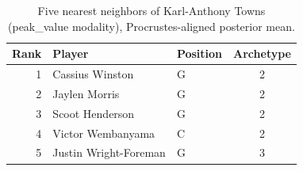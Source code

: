 \begin{table}[htbp]
  \centering\small
  \begin{tabular}{rllc}
    \toprule
    Rank & Player & Position & Archetype \\
    \midrule
    1 & Cassius Winston & G & 2 \\
    2 & Jaylen Morris & G & 2 \\
    3 & Scoot Henderson & G & 2 \\
    4 & Victor Wembanyama & C & 2 \\
    5 & Justin Wright-Foreman & G & 3 \\
    \bottomrule
  \end{tabular}
  \caption{Five nearest neighbors of Karl-Anthony Towns (peak_value modality), Procrustes-aligned posterior mean.}
  \label{tab:Karl_Anthony_Towns_neighbors_peak_value}
\end{table}

